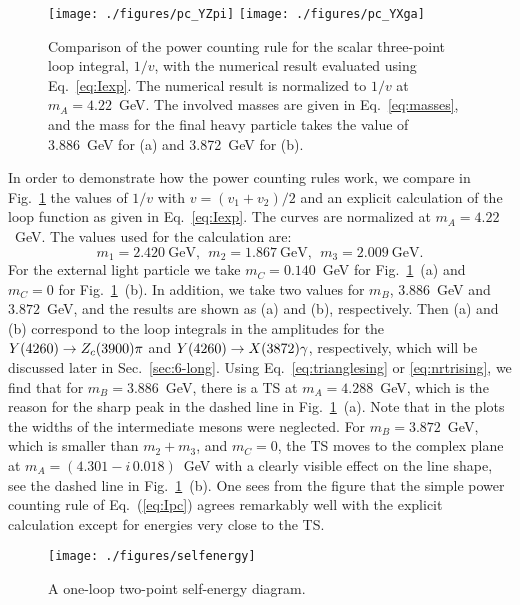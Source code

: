 \begin{figure}[tb]
  \begin{center}
   \texttt{[image: ./figures/pc\_YZpi]}\hfill
   \texttt{[image: ./figures/pc\_YXga]}
   \caption{
   Comparison of the power counting rule for the scalar three-point loop 
integral, $1/v$, with the numerical result evaluated using
Eq.~\eqref{eq:Iexp}. The numerical result is normalized to $1/v$ at 
$m_A=4.22$~GeV. The involved masses are given in Eq.~\eqref{eq:masses}, and 
the mass for the final heavy particle takes the value of 3.886~GeV for (a) and 
3.872~GeV for (b).
   \label{fig:pc}}
  \end{center}
\end{figure}
In order to demonstrate how the power counting rules work, we compare in 
Fig.~\ref{fig:pc} the values of $1/v$ with $v=(v_1+v_2)/2$ and an explicit 
calculation of the loop function as given in Eq.~\eqref{eq:Iexp}. The curves 
are  normalized at $m_A=4.22$~GeV. The values used for the calculation are:
\begin{equation}
  m_1 = 2.420~\text{GeV},~~ m_2= 1.867~\text{GeV}, ~~
 m_3 = 2.009~\text{GeV}. 
\label{eq:masses}
\end{equation}
For the external light particle we take $m_C=0.140$~GeV for 
Fig.~\ref{fig:pc}~(a) and $m_C=0$ for Fig.~\ref{fig:pc}~(b). 
In addition, we take two values for $m_B$, 3.886~GeV and $3.872$~GeV, and the 
results are shown as (a) and (b), respectively. 
Then (a) and (b) correspond to the loop integrals in the amplitudes for the 
$Y(4260)\to Z_c(3900)\pi$ and $Y(4260)\to X(3872)\gamma$, respectively, which will be discussed later 
in Sec.~\ref{sec:6-long}.
Using 
Eq.~\eqref{eq:trianglesing} or \eqref{eq:nrtrising}, we find that for 
$m_B=3.886$~GeV, there is a TS at $m_A=4.288$~GeV, which is 
the reason for the sharp peak in the dashed line in Fig.~\ref{fig:pc}~(a).
Note that in
the plots the widths of the intermediate mesons were neglected. For 
$m_B=3.872$~GeV, which is smaller than $m_2+m_3$, and $m_C=0$, the TS
moves to the complex plane at $m_A=(4.301-i\,0.018)$~GeV with a clearly
visible effect on the line shape, see the dashed line in 
Fig.~\ref{fig:pc}~(b). 
One sees from the figure that the simple power counting rule of
Eq.~(\ref{eq:Ipc}) agrees remarkably well with the explicit
calculation except for energies very close to the TS.

\begin{figure}[tb]
  \begin{center}
   \texttt{[image: ./figures/selfenergy]}\\
   \caption{A one-loop two-point self-energy diagram.
   \label{fig:selfenergy}}
  \end{center}
\end{figure}

